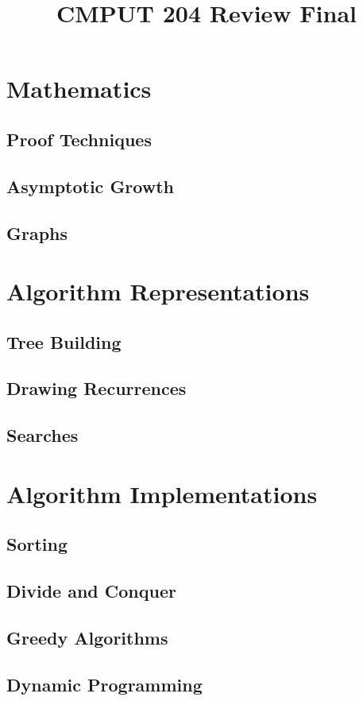 \documentclass{exam}
\title{CMPUT 204 Review Final}
\begin{document}
\maketitle

\section{Mathematics}

\subsection{Proof Techniques}

\subsection{Asymptotic Growth}

\subsection{Graphs}

\section{Algorithm Representations}

\subsection{Tree Building}

\subsection{Drawing Recurrences}

\subsection{Searches}

\section{Algorithm Implementations}

\subsection{Sorting}

\subsection{Divide and Conquer}

\subsection{Greedy Algorithms}

\subsection{Dynamic Programming}
\end{document}
